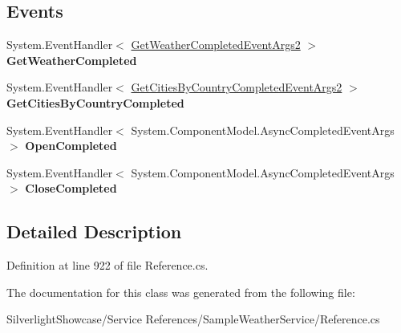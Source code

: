 \subsection*{Events}
\begin{DoxyCompactItemize}
\item 
\hypertarget{class_silverlight_showcase_1_1_sample_weather_service_1_1_global_weather_http_post_client_a9743614f4e7173fecef488999aef56fa}{
System.EventHandler$<$ \hyperlink{class_silverlight_showcase_1_1_sample_weather_service_1_1_get_weather_completed_event_args2}{GetWeatherCompletedEventArgs2} $>$ {\bfseries GetWeatherCompleted}}
\label{class_silverlight_showcase_1_1_sample_weather_service_1_1_global_weather_http_post_client_a9743614f4e7173fecef488999aef56fa}

\item 
\hypertarget{class_silverlight_showcase_1_1_sample_weather_service_1_1_global_weather_http_post_client_a48ea07a1c1d5fa6a244f9bc3e8238ebe}{
System.EventHandler$<$ \hyperlink{class_silverlight_showcase_1_1_sample_weather_service_1_1_get_cities_by_country_completed_event_args2}{GetCitiesByCountryCompletedEventArgs2} $>$ {\bfseries GetCitiesByCountryCompleted}}
\label{class_silverlight_showcase_1_1_sample_weather_service_1_1_global_weather_http_post_client_a48ea07a1c1d5fa6a244f9bc3e8238ebe}

\item 
\hypertarget{class_silverlight_showcase_1_1_sample_weather_service_1_1_global_weather_http_post_client_a05b54affbc2c7bad00e86b9f74c13dc2}{
System.EventHandler$<$ System.ComponentModel.AsyncCompletedEventArgs $>$ {\bfseries OpenCompleted}}
\label{class_silverlight_showcase_1_1_sample_weather_service_1_1_global_weather_http_post_client_a05b54affbc2c7bad00e86b9f74c13dc2}

\item 
\hypertarget{class_silverlight_showcase_1_1_sample_weather_service_1_1_global_weather_http_post_client_a982a92f2d7719f99152ed293d396ecee}{
System.EventHandler$<$ System.ComponentModel.AsyncCompletedEventArgs $>$ {\bfseries CloseCompleted}}
\label{class_silverlight_showcase_1_1_sample_weather_service_1_1_global_weather_http_post_client_a982a92f2d7719f99152ed293d396ecee}

\end{DoxyCompactItemize}


\subsection{Detailed Description}


Definition at line 922 of file Reference.cs.

The documentation for this class was generated from the following file:\begin{DoxyCompactItemize}
\item 
SilverlightShowcase/Service References/SampleWeatherService/Reference.cs\end{DoxyCompactItemize}
